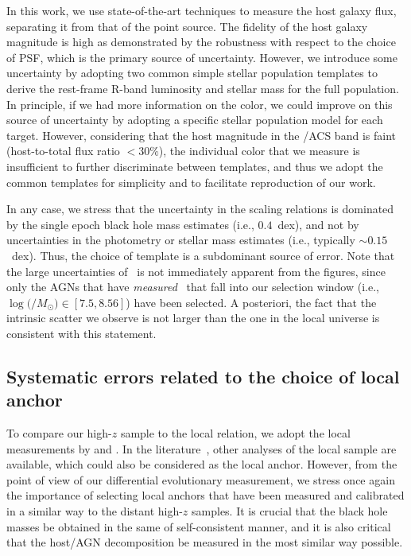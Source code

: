 \documentclass[apj]{emulateapj}
\begin{document}
In this work, we use state-of-the-art techniques to measure the host galaxy flux, separating it from that of the point source. The fidelity of the host galaxy magnitude is high as demonstrated by the robustness with respect to the choice of PSF, which is the primary source of uncertainty. However, we introduce some uncertainty by adopting two common simple stellar population templates to derive the rest-frame R-band luminosity and stellar mass for the full population. In principle, if we had more information on the color, we could improve on this source of uncertainty by adopting a specific stellar population model for each target. However, considering that the host magnitude in the \hst/ACS band is faint (host-to-total flux ratio $< 30\%$), the individual color that we measure is insufficient to further discriminate between templates, and thus we adopt the common templates for simplicity and to facilitate reproduction of our work.

In any case, we stress that the uncertainty in the scaling relations is dominated by the single epoch black hole mass estimates (i.e., $0.4$~dex), and not by uncertainties in the photometry or stellar mass estimates (i.e., typically $\sim0.15$~dex). Thus, the choice of template is a subdominant source of error. Note that the large uncertainties of \mbh\ is not immediately apparent from the figures, since only the AGNs that have {\it measured} \mbh\ that fall into our selection window (i.e., $\log($\mbh$/M_{\odot})\in[7.5, 8.56]$) have been selected. A posteriori, the fact that the intrinsic scatter we observe is not larger than the one in the local universe is consistent with this statement.

\subsection{Systematic errors related to the choice of local anchor}
\label{sec:local_sys}

To compare our high-$z$ sample to the local relation, we adopt the local measurements by \citet{Ben++10, Bennert++2011} and \citet{H+R04}. In the literature~\citep{Kormendy13, Bentz2018}, other analyses of the local sample are available, which could also be considered as the local anchor. However, from the point of view of our differential evolutionary measurement, we stress once again the importance of selecting local anchors that have been measured and calibrated in a similar way to the distant high-$z$ samples. It is crucial that the black hole masses be obtained in the same of self-consistent manner, and it is also critical that the host/AGN decomposition be measured in the most similar way possible.
\end{document}
